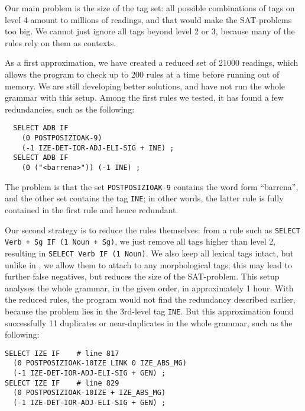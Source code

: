 \documentclass[11pt]{article}
\begin{document}

Our main problem is the size of the tag set: all possible combinations of tags on level 4 amount to millions of readings,
and that would make the SAT-problems too big.
We cannot just ignore all tags beyond level 2 or 3, because many of the rules rely on them as contexts.

As a first approximation, we have created a reduced set of 21000 readings, which allows the program to check up to 200 
rules at a time before running out of memory. We are still developing better solutions, and have not run the whole grammar with this setup.
Among the first rules we tested, it has found a few redundancies, such as the following:

\begin{verbatim}
  SELECT ADB IF
    (0 POSTPOSIZIOAK-9) 
    (-1 IZE-DET-IOR-ADJ-ELI-SIG + INE) ;
  SELECT ADB IF  
    (0 ("<barrena>")) (-1 INE) ;
\end{verbatim}

\noindent The problem is that the set \texttt{POSTPOSIZIOAK-9} contains the word form ``barrena'', and the other set contains the tag \texttt{INE}; in other words, the latter rule is fully contained in the first rule and hence redundant.


Our second strategy is to reduce the rules themselves: from a rule such as \texttt{SELECT Verb + Sg IF (1 Noun + Sg)},
we just remove all tags higher than level 2, resulting in
\texttt{SELECT Verb IF (1 Noun)}. We also keep all lexical tags
intact, but unlike in , we allow them to attach to any morphological tags; this may
lead to further false negatives, but reduces the size of the SAT-problem.
This setup analyses the whole grammar, in the given order, in approximately 1 hour. 
With the reduced rules, the program would not find the redundancy described earlier, because
the problem lies in the 3rd-level tag \texttt{INE}. But this approximation found successfully 11 duplicates or near-duplicates in the whole grammar, such as the following:

\begin{verbatim}
SELECT IZE IF 	 # line 817
  (0 POSTPOSIZIOAK-10IZE LINK 0 IZE_ABS_MG) 
  (-1 IZE-DET-IOR-ADJ-ELI-SIG + GEN) ; 
SELECT IZE IF 	 # line 829
  (0 POSTPOSIZIOAK-10IZE + IZE_ABS_MG) 
  (-1 IZE-DET-IOR-ADJ-ELI-SIG + GEN) ;
\end{verbatim}
\end{document}
